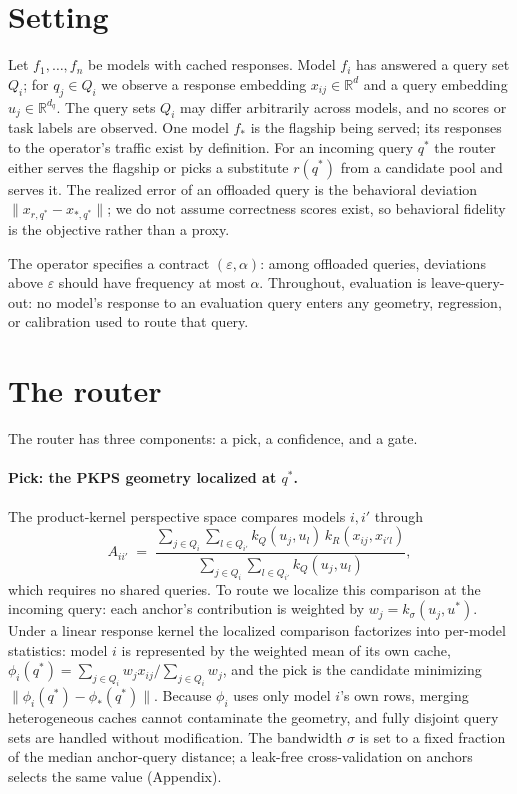 \documentclass{article}
\newcommand{\PKPS}{PKPS\xspace}
\newcommand{\eps}{\varepsilon}
\begin{document}
\section{Setting}

Let $f_1, \dots, f_n$ be models with cached responses. Model $f_i$ has
answered a query set $Q_i$; for $q_j \in Q_i$ we observe a response
embedding $x_{ij} \in \mathbb{R}^d$ and a query embedding
$u_j \in \mathbb{R}^{d_q}$. The query sets $Q_i$ may differ arbitrarily
across models, and no scores or task labels are observed. One model $f_*$
is the flagship being served; its responses to the operator's traffic
exist by definition. For an incoming query $q^*$ the router either serves
the flagship or picks a substitute $r(q^*)$ from a candidate pool and
serves it. The realized error of an offloaded query is the behavioral
deviation $\lVert x_{r,q^*} - x_{*,q^*} \rVert$; we do not assume
correctness scores exist, so behavioral fidelity is the objective rather
than a proxy.

The operator specifies a contract $(\eps, \alpha)$: among offloaded
queries, deviations above $\eps$ should have frequency at most $\alpha$.
Throughout, evaluation is leave-query-out: no model's response to an
evaluation query enters any geometry, regression, or calibration used to
route that query.

\section{The router}
\label{sec:method}

The router has three components: a pick, a confidence, and a gate.

\paragraph{Pick: the \PKPS geometry localized at $q^*$.}
The product-kernel perspective space compares models $i, i'$ through
\begin{equation}
A_{ii'} \;=\; \frac{\sum_{j \in Q_i} \sum_{l \in Q_{i'}}
  k_Q(u_j, u_l)\, k_R(x_{ij}, x_{i'l})}
 {\sum_{j \in Q_i} \sum_{l \in Q_{i'}} k_Q(u_j, u_l)},
\label{eq:pkps}
\end{equation}
which requires no shared queries. To route we localize this comparison at
the incoming query: each anchor's contribution is weighted by
$w_j = k_\sigma(u_j, u^*)$. Under a linear response kernel the localized
comparison factorizes into per-model statistics: model $i$ is represented
by the weighted mean of its own cache,
$\phi_i(q^*) = \sum_{j \in Q_i} w_j x_{ij} / \sum_{j \in Q_i} w_j$, and
the pick is the candidate minimizing
$\lVert \phi_i(q^*) - \phi_*(q^*) \rVert$. Because $\phi_i$ uses only
model $i$'s own rows, merging heterogeneous caches cannot contaminate the
geometry, and fully disjoint query sets are handled without modification.
The bandwidth $\sigma$ is set to a fixed fraction of the median
anchor-query distance; a leak-free cross-validation on anchors selects
the same value (Appendix).
\end{document}
